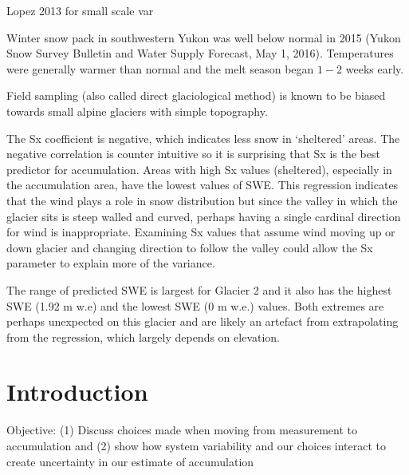 \documentclass[twocolumn,letterpaper]{igs}
\begin{document}
Lopez 2013 for small scale var

Winter snow pack in southwestern Yukon was well below normal in 2015 (Yukon Snow Survey Bulletin and Water Supply Forecast, May 1, 2016). Temperatures were generally warmer than normal and the melt season began $1-2$ weeks early. 

Field sampling (also called direct glaciological method) is known to be biased towards small alpine glaciers with simple topography.

The Sx coefficient is negative, which indicates less snow in ‘sheltered’ areas. The negative correlation is counter intuitive so it is surprising that Sx is the best predictor for accumulation.
 Areas with high Sx values (sheltered), especially in the accumulation area, have the lowest values of SWE. This regression indicates that the wind plays a role in snow distribution but since the valley in which the glacier sits is steep walled and curved, perhaps having a single cardinal direction for wind is inappropriate. Examining Sx values that assume wind moving up or down glacier and changing direction to follow the valley could allow the Sx parameter to explain more of the variance.





The range of predicted SWE is largest for Glacier 2 and it also has the highest SWE (1.92 m w.e) and the lowest SWE (0 m w.e.) values. Both extremes are perhaps unexpected on this glacier and are likely an artefact from extrapolating from the regression, which largely depends on elevation.







\section{Introduction}

Objective: (1) Discuss choices made when moving from measurement to accumulation and (2) show how system variability and our choices interact to create uncertainty in our estimate of accumulation
\end{document}

